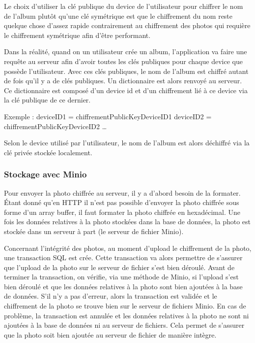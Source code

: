 \documentclass[
  11pt,
  paper=a4,
  ,captions=tableheading
]{scrartcl}
\begin{document}
Le choix d’utiliser la clé publique du device de l’utilisateur pour
chiffrer le nom de l’album plutôt qu’une clé symétrique est que le
chiffrement du nom reste quelque chose d’assez rapide contrairement au
chiffrement des photos qui requière le chiffrement symétrique afin
d’être performant.

Dans la réalité, quand on un utilisateur crée un album, l’application va
faire une requête au serveur afin d’avoir toutes les clés publiques pour
chaque device que possède l’utilisateur. Avec ces clés publiques, le nom
de l’album est chiffré autant de fois qu’il y a de clés publiques. Un
dictionnaire est alors renvoyé au serveur. Ce dictionnaire est composé
d’un device id et d’un chiffrement lié à ce device via la clé publique
de ce dernier.

Exemple : deviceID1 = chiffrementPublicKeyDeviceID1 deviceID2 =
chiffrementPublicKeyDeviceID2 …

Selon le device utilisé par l’utilisateur, le nom de l’album est alors
déchiffré via la clé privée stockée localement.

\hypertarget{stockage-avec-minio}{%
\subsubsection{Stockage avec Minio}\label{stockage-avec-minio}}

Pour envoyer la photo chiffrée au serveur, il y a d’abord besoin de la
formater. Étant donné qu’en HTTP il n’est pas possible d’envoyer la
photo chiffrée sous forme d’un array buffer, il faut formater la photo
chiffrée en hexadécimal. Une fois les données relatives à la photo
stockées dans la base de données, la photo est stockée dans un serveur à
part (le serveur de fichier Minio).

Concernant l’intégrité des photos, au moment d’upload le chiffrement de
la photo, une transaction SQL est crée. Cette transaction va alors
permettre de s’assurer que l’upload de la photo sur le serveur de
fichier s’est bien déroulé. Avant de terminer la transaction, on
vérifie, via une méthode de Minio, si l’upload s’est bien déroulé et que
les données relatives à la photo sont bien ajoutées à la base de
données. S’il n’y a pas d’erreur, alors la transaction est validée et le
chiffrement de la photo se trouve bien sur le serveur de fichiers Minio.
En cas de problème, la transaction est annulée et les données relatives
à la photo ne sont ni ajoutées à la base de données ni au serveur de
fichiers. Cela permet de s’assurer que la photo soit bien ajoutée au
serveur de fichier de manière intègre.
\end{document}
